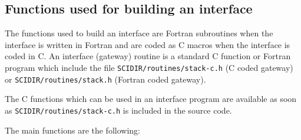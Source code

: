 \subsection{Functions used for building an interface}
The functions used to build an interface are Fortran subroutines when 
the interface is written in Fortran and are coded as C macros 
when the interface is coded in C. 
An interface (gateway) routine is a standard C function or Fortran 
program which include the file {\tt SCIDIR/routines/stack-c.h} 
(C coded gateway)  or  {\tt SCIDIR/routines/stack.h} (Fortran coded gateway).

The C functions which can be used in an interface program are available
as soon as {\tt SCIDIR/routines/stack-c.h} is included in the source code.

The main functions are the following:

